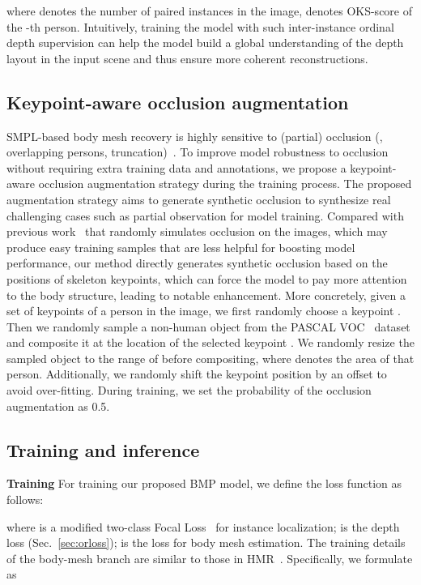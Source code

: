 \documentclass[final]{cvpr}
\newcommand{\myparagraph}[1]{{ \noindent \bf #1}}
\begin{document}
where  denotes the number of paired instances in the image,  denotes OKS-score of the -th person.
Intuitively, training the model with such inter-instance ordinal depth supervision can help the model build a global understanding of the depth layout in the input scene and thus ensure more coherent reconstructions.

\vspace{-1mm}
\subsection{Keypoint-aware occlusion augmentation} \label{sec:occaug}
SMPL-based body mesh recovery is highly sensitive to (partial) occlusion (\eg, overlapping persons, truncation)~\cite{zhang2020object,rockwell2020full}.
To improve model robustness to occlusion without requiring extra training data and annotations, we propose a keypoint-aware occlusion augmentation strategy during the training process.
The proposed augmentation strategy aims to generate synthetic occlusion to synthesize real challenging cases such as partial observation for model training.
Compared with previous work~\cite{sarandi2018robust} that randomly simulates occlusion on the images, which may produce easy training samples that are less helpful for boosting model performance,
our method directly generates synthetic occlusion based on the positions of skeleton keypoints, which can force the model to pay more attention to the body structure, leading to notable enhancement. 
More concretely, given a set of  keypoints  of a person in the image, we first randomly choose a keypoint . 
Then we randomly sample a non-human object from the PASCAL VOC~\cite{everingham2011pascal} dataset and composite it at the location of the selected keypoint . 
We randomly resize the sampled object to the range of  before compositing, where  denotes the area of that person.
Additionally, we randomly shift the keypoint position by an offset  to avoid over-fitting.
During training, we set the probability of the occlusion augmentation as 0.5. 

\subsection{Training and inference} \label{sec:train_inference}

\myparagraph{Training}
For training our proposed BMP model, we define the loss function  as follows:

where  is a modified two-class Focal Loss~\cite{lin2017focal} for instance localization;  is the depth loss (Sec.~\ref{sec:orloss});  is the loss for body mesh estimation. 
The training details of the body-mesh branch are similar to those in HMR~\cite{hmrKanazawa17}. Specifically, we formulate  as
\end{document}
